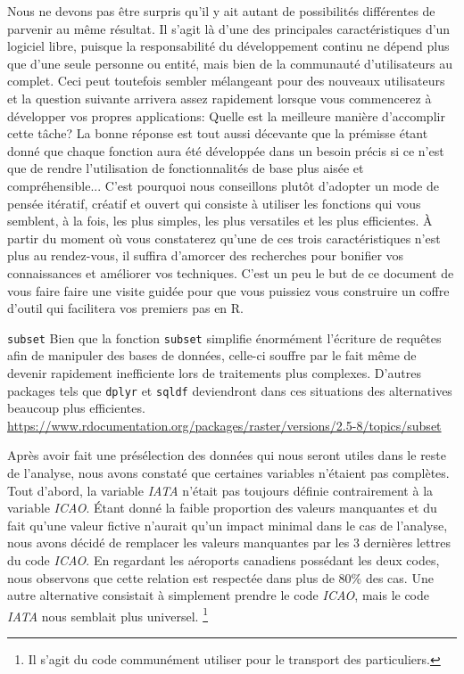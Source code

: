\vspace{\baselineskip}
Nous ne devons pas être surpris qu'il y ait autant de possibilités différentes de parvenir au même résultat. Il s'agit là d'une des principales caractéristiques d'un logiciel libre, puisque la responsabilité du développement continu ne dépend plus que d'une seule personne ou entité, mais bien de la communauté d'utilisateurs au complet. Ceci peut toutefois sembler mélangeant pour des nouveaux utilisateurs et la question suivante arrivera assez rapidement lorsque vous commencerez à développer vos propres applications: Quelle est la meilleure manière d'accomplir cette tâche? La bonne réponse est tout aussi décevante que la prémisse étant donné que chaque fonction aura été développée dans un besoin précis si ce n'est que de rendre l'utilisation de fonctionnalités de base plus aisée et compréhensible... C'est pourquoi nous conseillons plutôt d'adopter un mode de pensée itératif, créatif et ouvert qui consiste à utiliser les fonctions qui vous semblent, à la fois, les plus simples, les plus versatiles et les plus efficientes. À partir du moment où vous constaterez qu'une de ces trois caractéristiques n'est plus au rendez-vous, il suffira d'amorcer des recherches pour bonifier vos connaissances et améliorer vos techniques. C'est un peu le but de ce document de vous faire faire une visite guidée pour que vous puissiez vous construire un coffre d'outil qui facilitera vos premiers pas en R. \\

\begin{moreInfo}{\texttt{subset}}
	Bien que la fonction \texttt{subset} simplifie énormément l'écriture de requêtes afin de manipuler des bases de données, celle-ci souffre par le fait même de devenir rapidement inefficiente lors de traitements plus complexes. D'autres packages tels que \texttt{dplyr} et \texttt{sqldf} deviendront dans ces situations des alternatives beaucoup plus efficientes. \\
	\url{https://www.rdocumentation.org/packages/raster/versions/2.5-8/topics/subset}
\end{moreInfo}

Après avoir fait une présélection des données qui nous seront utiles dans le reste de l'analyse, nous avons constaté que certaines variables n'étaient pas complètes. Tout d'abord, la variable \emph{IATA} n'était pas toujours définie contrairement à la variable \emph{ICAO}. Étant donné la faible proportion des valeurs manquantes et du fait qu'une valeur fictive n'aurait qu'un impact minimal dans le cas de l'analyse, nous avons décidé de remplacer les valeurs manquantes par les 3 dernières lettres du code \emph{ICAO}. En regardant les aéroports canadiens possédant les deux codes, nous observons que cette relation est respectée dans plus de 80\% des cas. Une autre alternative consistait à simplement prendre le code \emph{ICAO}, mais le code \emph{IATA} nous semblait plus universel. \footnote{Il s'agit du code communément utiliser pour le transport des particuliers.} \\


